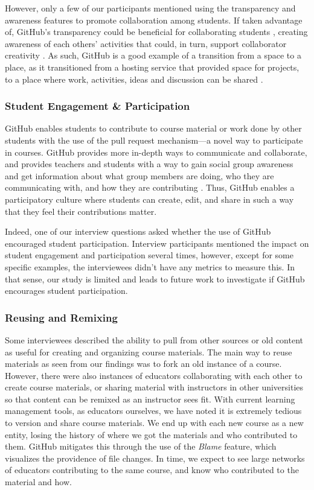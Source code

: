 However, only a few of our participants mentioned using the transparency and awareness features to promote collaboration among students. If taken advantage of, GitHub's transparency could be beneficial for collaborating students \cite{dalsgaard2009transparency}, creating awareness of each others' activities that could, in turn, support collaborator creativity \cite{farooq2007supporting}. As such, GitHub is a good example of a transition from a space to a place, as it transitioned from a hosting service that provided space for projects, to a place where work, activities, ideas and discussion can be shared \cite{dourish1992awareness}.
\\ %
\subsubsection{Student Engagement \& Participation}
GitHub enables students to contribute to course material or work done by other students with the use of the pull request mechanism---a novel way to participate in courses. GitHub provides more in-depth ways to communicate and collaborate, and provides teachers and students with a way to gain social group awareness and get information about what group members are doing, who they are communicating with, and how they are contributing \cite{janssen2013coordinated}. Thus, GitHub enables a participatory culture \cite{jenkins2009confronting} where students can create, edit, and share in such a way that they feel their contributions matter.

Indeed, one of our interview questions asked whether the use of GitHub encouraged student participation. Interview participants mentioned the impact on student engagement and participation several times, however, except for some specific examples, the interviewees didn't have any metrics to measure this. In that sense, our study is limited and leads to future work to investigate if GitHub encourages student participation.

\subsubsection{Reusing and Remixing}
Some interviewees described the ability to pull from other sources or old content as useful for creating and organizing course materials. The main way to reuse materials as seen from our findings was to fork an old instance of a course. However, there were also instances of educators collaborating with each other to create course materials, or sharing material with instructors in other universities so that content can be remixed as an instructor sees fit. With current learning management tools, as educators ourselves, we have noted it is extremely tedious to version and share course materials. We end up with each new course as a new entity, losing the history of where we got the materials and who contributed to them. GitHub mitigates this through the use of the \textit{Blame} feature, which visualizes the providence of file changes. In time, we expect to see large networks of educators contributing to the same course, and know who contributed to the material and how.

